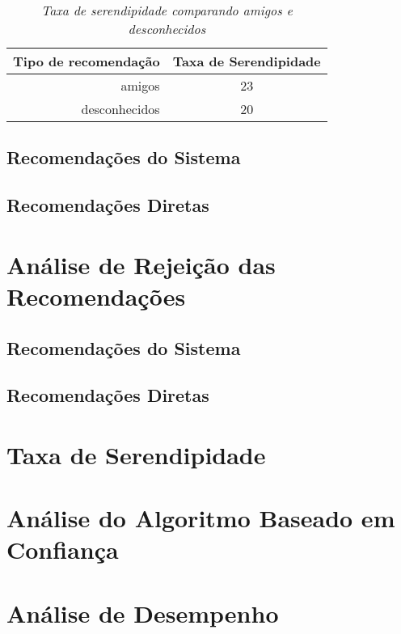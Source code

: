 \begin{table}
\centering
\begin{tabular}{|r|c|}
    \hline
    Tipo de recomendação & Taxa de Serendipidade \\
\hline 
amigos & 23 \\
\hline 
desconhecidos & 20 \\
\hline        
\end{tabular}
\caption{\it Taxa de serendipidade comparando amigos e desconhecidos}
\label{table:serendipidade_diretas}
\end{table}


 
\subsection{Recomendações do Sistema}

\subsection{Recomendações Diretas}


\section{Análise de Rejeição das Recomendações}
\label{sec:analise_de_rejeicao_das_recomendacoes}

\subsection{Recomendações do Sistema}

\subsection{Recomendações Diretas}


\section{Taxa de Serendipidade}
\label{sec:taxa_de_serendipidade}


\section{Análise do Algoritmo Baseado em Confiança}
\label{sec:analise_do_algoritmo_baseado_em_confianca}


\section{Análise de Desempenho}
\label{sec:analise_de_desempenho}

